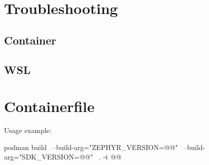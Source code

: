 \newpage

\appendix



\newpage

\section{Troubleshooting}



\subsection{Container}



\subsection{WSL}



\newpage
\fancyfoot{}

\section{Containerfile}
\label{containerfile}



Usage example:

\begin{monobox}
podman build \
  --build-arg="ZEPHYR_VERSION=@\zephyrversion{}@" \
  --build-arg="SDK_VERSION=@\sdkversion{}@" \
  . -t @\imagename{}@
\end{monobox}


